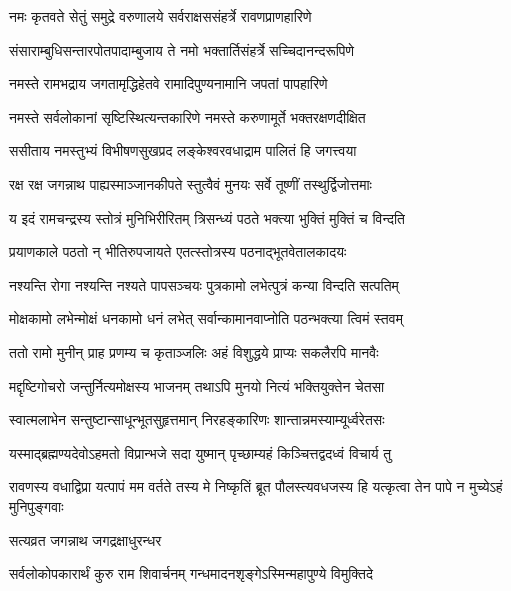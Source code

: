 \twolineshloka
{नमः कृतवते सेतुं समुद्रे वरुणालये}
{सर्वराक्षससंहर्त्रे रावणप्राणहारिणे}%

\twolineshloka
{संसाराम्बुधिसन्तारपोतपादाम्बुजाय ते}
{नमो भक्तार्तिसंहर्त्रे सच्चिदानन्दरूपिणे}%

\twolineshloka
{नमस्ते रामभद्राय जगतामृद्धिहेतवे}
{रामादिपुण्यनामानि जपतां पापहारिणे}%

\twolineshloka
{नमस्ते सर्वलोकानां सृष्टिस्थित्यन्तकारिणे}
{नमस्ते करुणामूर्ते भक्तरक्षणदीक्षित}%

\twolineshloka
{ससीताय नमस्तुभ्यं विभीषणसुखप्रद}
{लङ्केश्वरवधाद्राम पालितं हि जगत्त्वया}%

\twolineshloka
{रक्ष रक्ष जगन्नाथ पाह्यस्माञ्जानकीपते}
{स्तुत्वैवं मुनयः सर्वे तूष्णीं तस्थुर्द्विजोत्तमाः}%


\twolineshloka
{य इदं रामचन्द्रस्य स्तोत्रं मुनिभिरीरितम्}
{त्रिसन्ध्यं पठते भक्त्या भुक्तिं मुक्तिं च विन्दति}%

\twolineshloka
{प्रयाणकाले पठतो न् भीतिरुपजायते}
{एतत्स्तोत्रस्य पठनाद्भूतवेतालकादयः}%

\twolineshloka
{नश्यन्ति रोगा नश्यन्ति नश्यते पापसञ्चयः}
{पुत्रकामो लभेत्पुत्रं कन्या विन्दति सत्पतिम्}%

\twolineshloka
{मोक्षकामो लभेन्मोक्षं धनकामो धनं लभेत्}
{सर्वान्कामानवाप्नोति पठन्भक्त्या त्विमं स्तवम्}%

\twolineshloka
{ततो रामो मुनीन् प्राह प्रणम्य च कृताञ्जलिः}
{अहं विशुद्धये प्राप्यः सकलैरपि मानवैः}%

\twolineshloka
{मद्दृष्टिगोचरो जन्तुर्नित्यमोक्षस्य भाजनम्}
{तथाऽपि मुनयो नित्यं भक्तियुक्तेन चेतसा}%

\twolineshloka
{स्वात्मलाभेन सन्तुष्टान्साधून्भूतसुहृत्तमान्}
{निरहङ्कारिणः शान्तान्नमस्याम्यूर्ध्वरेतसः}%

\twolineshloka
{यस्माद्ब्रह्मण्यदेवोऽहमतो विप्रान्भजे सदा}
{युष्मान् पृच्छाम्यहं किञ्चित्तद्वदध्वं विचार्य तु}%

\threelineshloka
{रावणस्य वधाद्विप्रा यत्पापं मम वर्तते}
{तस्य मे निष्कृतिं ब्रूत पौलस्त्यवधजस्य हि}
{यत्कृत्वा तेन पापे न मुच्येऽहं मुनिपुङ्गवाः}%



\onelineshloka
{सत्यव्रत जगन्नाथ जगद्रक्षाधुरन्धर}%

\twolineshloka
{सर्वलोकोपकारार्थं कुरु राम शिवार्चनम्}
{गन्धमादनशृङ्गेऽस्मिन्महापुण्ये विमुक्तिदे}%

